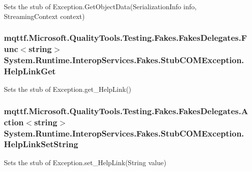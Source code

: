 Sets the stub of Exception.\-Get\-Object\-Data(\-Serialization\-Info info, Streaming\-Context context)

\hypertarget{class_system_1_1_runtime_1_1_interop_services_1_1_fakes_1_1_stub_c_o_m_exception_a446b7d17133024bdbe1bb817ba079451}{
\subsubsection[{Help\-Link\-Get}]{\setlength{\rightskip}{0pt plus 5cm}mqttf.\-Microsoft.\-Quality\-Tools.\-Testing.\-Fakes.\-Fakes\-Delegates.\-Func$<$string$>$ System.\-Runtime.\-Interop\-Services.\-Fakes.\-Stub\-C\-O\-M\-Exception.\-Help\-Link\-Get}}\label{class_system_1_1_runtime_1_1_interop_services_1_1_fakes_1_1_stub_c_o_m_exception_a446b7d17133024bdbe1bb817ba079451}


Sets the stub of Exception.\-get\-\_\-\-Help\-Link()

\hypertarget{class_system_1_1_runtime_1_1_interop_services_1_1_fakes_1_1_stub_c_o_m_exception_a1c7622329ad109018e7dd3d31e79842d}{
\subsubsection[{Help\-Link\-Set\-String}]{\setlength{\rightskip}{0pt plus 5cm}mqttf.\-Microsoft.\-Quality\-Tools.\-Testing.\-Fakes.\-Fakes\-Delegates.\-Action$<$string$>$ System.\-Runtime.\-Interop\-Services.\-Fakes.\-Stub\-C\-O\-M\-Exception.\-Help\-Link\-Set\-String}}\label{class_system_1_1_runtime_1_1_interop_services_1_1_fakes_1_1_stub_c_o_m_exception_a1c7622329ad109018e7dd3d31e79842d}


Sets the stub of Exception.\-set\-\_\-\-Help\-Link(\-String value)

